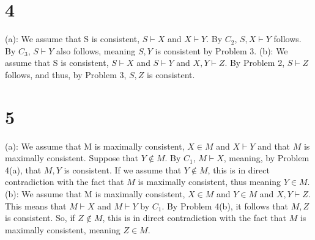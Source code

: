 \documentclass{article}
\theoremstyle{definition}
\begin{document}
\section*{4}
(a): We assume that S is consistent,
$S\vdash X$ and $X\vdash Y$. By $C_2$, $S,X\vdash Y$ follows. By $C_3$, $S\vdash Y$ also follows, meaning $S,Y$ is consistent by 
Problem 3.\newline
(b): We assume that S is consistent,  
$S\vdash X$ and $S\vdash Y$ and $X,Y\vdash Z$. By Problem 2, $S\vdash Z$ follows, and thus, by Problem 3, $S,Z$ is consistent.

\section*{5}
(a): We assume that M is maximally consistent, 
$X\in M$ and $X\vdash Y$ and that $M$ is maximally consistent. Suppose that $Y\notin M$. By $C_1$, $M\vdash X$, meaning, by Problem 4(a),
that $M,Y$ is consistent. If we assume that $Y\notin M$, this is in direct contradiction with the fact that $M$ is maximally consistent, thus meaning 
$Y\in M$.\newline
(b): We assume that M is maximally consistent, $X\in M$ and $Y\in M$ and $X,Y\vdash Z$. This means that $M\vdash X$ and $M\vdash Y$ by $C_1$. By 
Problem 4(b), it follows that $M,Z$ is consistent. So, if $Z\notin M$, this is in direct contradiction with the fact that $M$ is maximally consistent, 
meaning $Z\in M$. 
\end{document}
